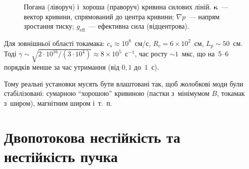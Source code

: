 \begin{figure}[ht]\centering
	\caption{Погана (ліворуч) і~хороша (праворуч) кривина силових ліній. $\boldsymbol\kappa$~--- вектор кривини,
	спрямований до центра кривини; $\nabla p$~--- напрям зростання тиску; $g_\mathrm{eff}$~--- ефективна сила (відцентрова).}
	\label{fig:curvature}
\end{figure}

\begin{Estimate}
Для зовнішньої області токамака: $c_s\approx10^8$~см/с, $R_c=6\times10^2$~см,
$L_p\sim50$~см. Тоді $\gamma\sim\sqrt{2\cdot10^{16}/(3\cdot10^4)}\approx8\times10^5$~с$^{-1}$,
час росту $\sim1$~мкс, що на~5--6 порядків менше за час утримання (від $0{,}1$ до~$1$~с).
\end{Estimate}

Тому реальні установки мусять
бути влаштовані так, щоб жолобкові моди були стабілізовані: сумарною \enquote{хорошою} кривиною
(пастки з~мінімумом $B$, токамак з~широм), магнітним широм і~т.~п.

\section{Двопотокова нестійкість та нестійкість пучка}\label{sec:two-stream}

